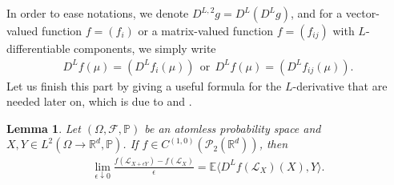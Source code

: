 \documentclass[12pt]{article}
\newtheorem{lemma}[theorem]{Lemma}
\newcommand{\ra}{\rightarrow}
\def\L{\mathscr{L}}
\def\R{\mathbb R}
\def\da{\downarrow}
\def\E{\mathbb E}
\numberwithin{equation}{section}
\begin{document}
	In order to ease notations, we denote $D^{L,2}g=D^L(D^Lg)$, and for a vector-valued function $f=(f_i)$ or a matrix-valued function $f=(f_{ij})$ with $L$-differentiable components, we simply write
	\begin{align*}
		D^Lf(\mu)=(D^Lf_i(\mu))  \ \  \mathrm{or}\ \ D^Lf(\mu)=(D^Lf_{ij}(\mu)).
	\end{align*}
	Let us finish this part by giving a useful formula for the $L$-derivative that are needed later on, which is due to \cite[Theorem 6.5]{Cardaliaguet13} and \cite[Proposition 3.1]{6}.
	\begin{lemma}\label{FoLD}
		Let $(\Omega,\mathscr{F},\mathbb{P})$ be an atomless probability space and $X,Y\in L^2(\Omega\ra\R^d,\mathbb{P})$.
		If $f\in C^{(1,0)}(\mathscr{P}_2(\R^d))$, then
		\begin{align*}
			\lim_{\epsilon\da0}\frac {f(\L_{X+\epsilon Y})-f(\L_X)} \epsilon=\E\langle D^Lf(\L_X)(X),Y\rangle.
		\end{align*}
	\end{lemma}
	
\end{document}
